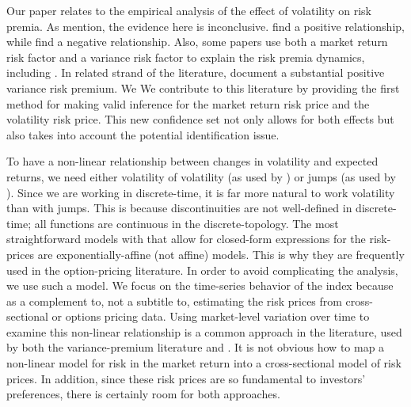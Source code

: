 Our paper relates to the empirical analysis of the effect of volatility on risk premia. As \textcite{lettau2010measuring} mention,  the evidence here is inconclusive. \textcites{bollerslev1988capital, harvey1989timevarying, ghysels2005there, bali2006there, ludvigson2007empirical} find a positive relationship, while \textcites{campbell1987stock, breen1989economic, pagan1991nonparametric, whitelaw1994time, brandt2004relationship} find a negative relationship. Also, some papers use both a market return risk factor and a variance risk factor to explain the risk premia dynamics, including \textcites{christoffersen2013capturing, feunou2014risk, dewbecker2017price}. In related strand of the literature, \textcite{bollerslev2008risk, drechsler2011whats} document a substantial positive variance risk premium. We We contribute to this literature by providing the first method for making valid inference for the market return risk price and the volatility risk price. This new confidence set not only allows for both effects but also takes into account the potential identification issue.

To have a non-linear relationship between changes in volatility and expected returns, we need either volatility of volatility (as used by \textcite{drechsler2011whats}) or jumps (as used by \textcite{drechsler2014uncertainty}).   Since we are working in discrete-time, it is far more natural to work volatility than with jumps. 
This is because discontinuities are not well-defined in discrete-time; all functions are continuous in the discrete-topology. The most straightforward models  with that allow for closed-form expressions for the risk-prices are exponentially-affine (not affine) models. This is why they are frequently used  in the option-pricing literature.  In order to avoid complicating the analysis, we use such a model. We focus on the time-series behavior of the index because as a complement to, not a subtitle to, estimating the risk prices from cross-sectional or options pricing data. Using market-level variation over time to examine this non-linear relationship is a common approach in the literature, used by both the variance-premium literature and \textcite{han2018leveragte}.  It is not obvious how to map a non-linear model for risk in the market return into a cross-sectional model of risk prices. In addition, since these risk prices are so fundamental to investors' preferences, there is certainly room for both approaches.


